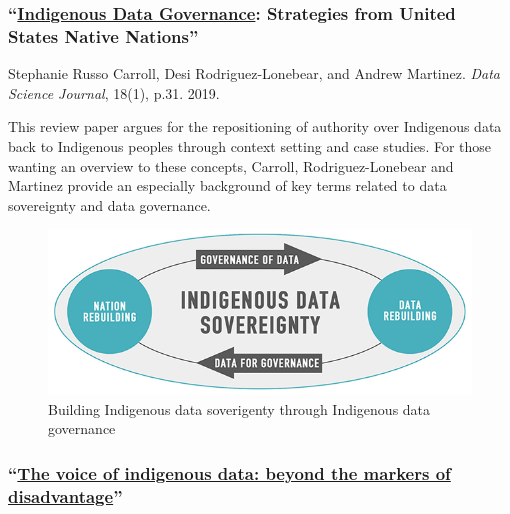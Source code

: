 \documentclass[
]{book}
\begin{document}
\hypertarget{indigenous-data-governance-strategies-from-united-states-native-nations}{%
\subsubsection*{\texorpdfstring{``\href{https://datascience.codata.org/articles/10.5334/dsj-2019-031/}{Indigenous Data Governance}: Strategies from United States Native Nations''}{``Indigenous Data Governance: Strategies from United States Native Nations''}}\label{indigenous-data-governance-strategies-from-united-states-native-nations}}

Stephanie Russo Carroll, Desi Rodriguez-Lonebear, and Andrew Martinez. \emph{Data Science Journal}, 18(1), p.31. 2019.

This review paper argues for the repositioning of authority over Indigenous data back to Indigenous peoples through context setting and case studies. For those wanting an overview to these concepts, Carroll, Rodriguez-Lonebear and Martinez provide an especially background of key terms related to data sovereignty and data governance.

\begin{figure}
\includegraphics[width=8.89in]{images/download} \caption{Building Indigenous data soverigenty through Indigenous data governance}\label{fig:unnamed-chunk-5}
\end{figure}

\hypertarget{the-voice-of-indigenous-data-beyond-the-markers-of-disadvantage}{%
\subsubsection*{\texorpdfstring{``\href{https://www.griffithreview.com/articles/voice-indigenous-data-beyond-disadvantage/}{The voice of indigenous data: beyond the markers of disadvantage}''}{``The voice of indigenous data: beyond the markers of disadvantage''}}\label{the-voice-of-indigenous-data-beyond-the-markers-of-disadvantage}}
\end{document}
